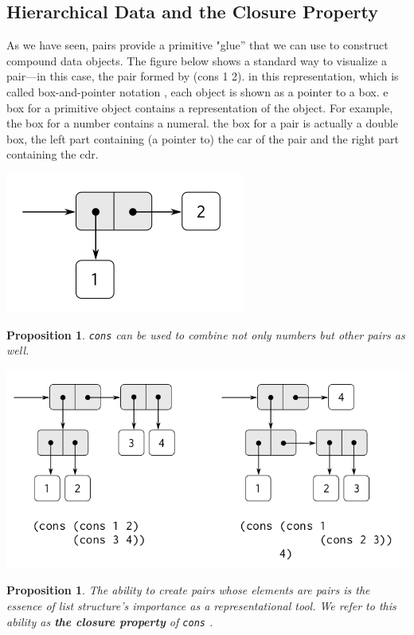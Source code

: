 \documentclass[a4paper,twoside]{article}
\newtheorem{proposition}[theorem]{Proposition}
\numberwithin{equation}{section}
\begin{document}
\subsection{Hierarchical Data and the Closure Property}
As we have seen, pairs provide a primitive "glue” that we can use to construct compound data objects.
The figure below shows a standard way to visualize a pair—in this case, the pair formed by (cons 1 2).
in this representation, which is called box-and-pointer notation , each object is shown as a pointer
to a box. e box for a primitive object contains a representation of the object. For example,
the box for a number contains a numeral. the box for a pair is actually a double box,
the left part containing (a pointer to) the car of the pair and the right part containing the cdr.
\begin{center}
    \includegraphics[scale = 0.5]{assets/box_pointer.png}
\end{center}
\begin{proposition}
    \texttt{cons} can be used to combine not only numbers but other pairs as well.
\end{proposition}
\begin{center}
    \includegraphics[scale = 0.25]{assets/cons_of_cons.png}
\end{center}
\begin{proposition}
    The ability to create pairs whose elements are pairs is the essence of list structure's
    importance as a representational tool.
    We refer to this ability as \textbf{the closure property} of \texttt{cons} .
\end{proposition}
\end{document}
